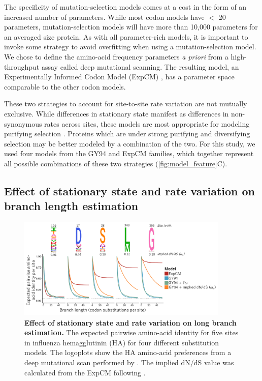 \documentclass[11pt]{article}
\begin{document}
The specificity of mutation-selection models comes at a cost in the form of an increased number of parameters. 
While most codon models have $<$ 20 parameters, mutation-selection models will have more than 10,000 parameters for an averaged size protein. 
As with all parameter-rich models, it is important to invoke some strategy to avoid overfitting when using a mutation-selection model.
We chose to define the amino-acid frequency parameters \textit{a priori} from a high-throughput assay called deep mutational scanning. 
The resulting model, an Experimentally Informed Codon Model (ExpCM) \citep{bloom2014experimentally, hilton2017phydms}, has a parameter space comparable to the other codon models.

These two strategies to account for site-to-site rate variation are not mutually exclusive. 
While differences in stationary state manifest as differences in non-synonymous rates across sites, these models are most appropriate for modeling purifying selection \citep{spielman2015relationship}.
Proteins which are under strong purifying and diversifying selection may be better modeled by a combination of the two. 
For this study, we used four models from the GY94 and ExpCM families, which together represent all possible combinations of these two strategies (\ref{fig:model_feature}C). 

\subsection*{Effect of stationary state and rate variation on branch length estimation}

\begin{figure}[H]
\centerline{\includegraphics[width=0.90\textwidth]{figures/decay.pdf}}
\caption{\label{fig:decay}
\textbf{Effect of stationary state and rate variation on long branch estimation.}
The expected pairwise amino-acid identity for five sites in influenza hemagglutinin (HA) for four different substitution models. 
The logoplots show the HA amino-acid preferences from a deep mutational scan performed by \cite{doud2016accurate}. 
The implied dN/dS value was calculated from the ExpCM following \cite{spielman2015relationship}.
}
\end{figure}
\end{document}
